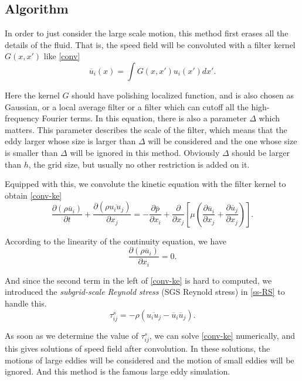 \documentclass[english, nochinese]{pkupaper}
\begin{document}
\subsection{Algorithm}
\par In order to just consider the large scale motion, this method first erases all the details of the fluid. That is, the speed field will be convoluted with a filter kernel $G(x, x')$ like \eqref{conv}
\begin{equation}\label{conv}
	\overline{u}_i(x) = \int G(x, x')u_i(x')dx'.
\end{equation}
\par Here the kernel $G$ should have polishing localized function, and is also chosen as Gaussian, or a local average filter or a filter which can cutoff all the high-frequency Fourier terms. In this equation, there is also a parameter $\Delta$ which matters. This parameter describes the scale of the filter, which means that the eddy larger whose size is larger than $\Delta$ will be considered and the one whose size is smaller than $\Delta$ will be ignored in this method. Obviously $\Delta$ should be larger than $h$, the grid size, but usually no other restriction is added on it.
\par Equipped with this, we convolute the kinetic equation with the filter kernel to obtain \eqref{conv-ke}
\begin{equation}\label{conv-ke}
	\frac{\partial(\rho\overline{u}_i)}{\partial t} + \frac{\partial(\rho\overline{u_iu_j})}{\partial x_j} = -\frac{\partial\overline{p}}{\partial x_i} + \frac{\partial}{\partial x_j}\left[\mu\left(\frac{\partial\overline{u}_i}{\partial x_j}+\frac{\partial\overline{u}_j}{\partial x_j}\right)\right].
\end{equation}
\par According to the linearity of the continuity equation, we have
\begin{equation}
	\frac{\partial(\rho\overline{u}_i)}{\partial x_i} = 0.
\end{equation}
\par And since the second term in the left of \eqref{conv-ke} is hard to computed, we introduced the \emph{subgrid-scale Reynold stress} (SGS Reynold stress) in \eqref{ss-RS} to handle this.
\begin{equation}\label{ss-RS}
	\tau_{ij}^s = -\rho(\overline{u_iu_j}-\overline{u}_i\overline{u}_j).
\end{equation}
\par As soon as we determine the value of $\tau_{ij}^s$, we can solve \eqref{conv-ke} numerically, and this gives solutions of speed field after convolution. In these solutions, the motions of large eddies will be considered and the motion of small eddies will be ignored. And this method is the famous large eddy simulation. 
\end{document}
